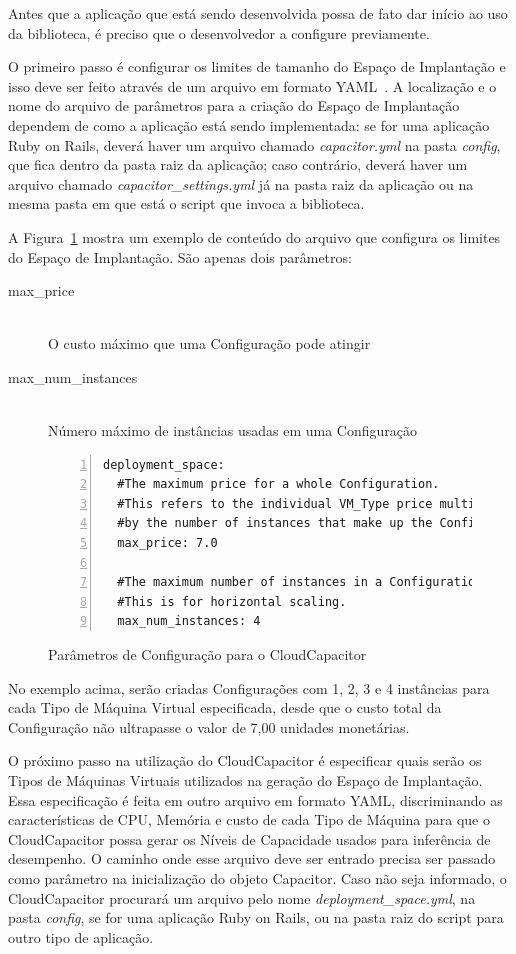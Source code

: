 Antes que a aplicação que está sendo desenvolvida possa de fato dar início ao uso 
da biblioteca, é preciso que o desenvolvedor a configure previamente. 

O primeiro passo é configurar os limites de tamanho do Espaço de Implantação e 
isso deve ser feito através de um arquivo em formato YAML~\cite{yml}. A localização 
e o nome do arquivo de parâmetros para a criação do Espaço de Implantação dependem 
de como a aplicação está sendo implementada: se for uma aplicação Ruby on Rails, 
deverá haver um arquivo chamado \emph{capacitor.yml} na pasta \emph{config}, que 
fica dentro da pasta raiz da aplicação; caso contrário, deverá haver um arquivo 
chamado \emph{capacitor\_settings.yml} já na pasta raiz da aplicação ou na mesma 
pasta em que está o script que invoca a biblioteca. 

A Figura~\ref{fig:settings} mostra um exemplo de conteúdo do arquivo que configura
os limites do Espaço de Implantação. São apenas dois parâmetros:

\begin{description}
  \item[max\_price] \hfill \\ O custo máximo que uma Configuração pode atingir
  \item[max\_num\_instances] \hfill \\ Número máximo de instâncias usadas em uma Configuração 
\end{description}

\begin{figure}[h]
 \begin{lstlisting}[linewidth=\textwidth,xleftmargin=.04\textwidth, numbers=left]
deployment_space:
  #The maximum price for a whole Configuration.
  #This refers to the individual VM_Type price multiplied 
  #by the number of instances that make up the Configuration
  max_price: 7.0

  #The maximum number of instances in a Configuration. 
  #This is for horizontal scaling.
  max_num_instances: 4
  \end{lstlisting}
  \caption{\label{fig:settings}Parâmetros de Configuração para o CloudCapacitor}
\end{figure}

No exemplo acima, serão criadas Configurações com 1, 2, 3 e 4 instâncias para cada
Tipo de Máquina Virtual especificada, desde que o custo total da Configuração não
ultrapasse o valor de 7,00 unidades monetárias.

O próximo passo na utilização do CloudCapacitor é especificar quais serão os Tipos
de Máquinas Virtuais utilizados na geração do Espaço de Implantação. Essa 
especificação é feita em outro arquivo em formato YAML, discriminando as 
características de CPU, Memória e custo de cada Tipo de Máquina para que o
CloudCapacitor possa gerar os Níveis de Capacidade usados para inferência de
desempenho. O caminho onde esse arquivo deve ser entrado precisa ser passado 
como parâmetro na inicialização do objeto Capacitor. Caso não seja informado, o 
CloudCapacitor procurará um arquivo pelo nome \emph{deployment\_space.yml}, na
pasta \emph{config}, se for uma aplicação Ruby on Rails, ou na pasta raiz do
script para outro tipo de aplicação.
 
